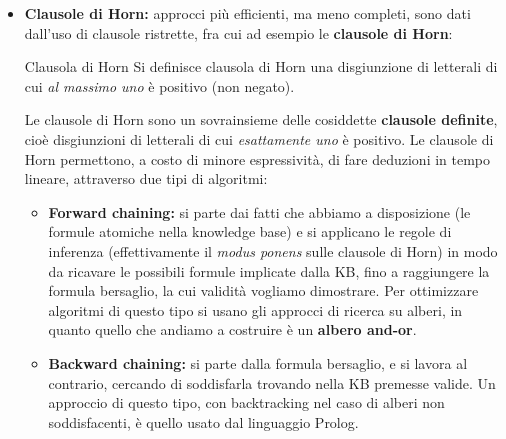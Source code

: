 \documentclass[a4paper,11pt]{article}
\begin{document}
\begin{itemize}
\begin{itemize}
\item \textbf{Clausole di Horn:}
approcci più efficienti, ma meno completi, sono dati dall'uso di clausole ristrette, fra cui ad esempio le \textbf{clausole di Horn}:
\begin{definition}{Clausola di Horn}
	Si definisce clausola di Horn una disgiunzione di letterali di cui \textit{al massimo uno} è positivo (non negato).
\end{definition}
Le clausole di Horn sono un sovrainsieme delle cosiddette \textbf{clausole definite}, cioè disgiunzioni di letterali di cui \textit{esattamente uno} è positivo.
Le clausole di Horn permettono, a costo di minore espressività, di fare deduzioni in tempo lineare, attraverso due tipi di algoritmi:
\begin{itemize}
	\item \textbf{Forward chaining:} si parte dai fatti che abbiamo a disposizione (le formule atomiche nella knowledge base) e si applicano le regole di inferenza (effettivamente il \textit{modus ponens} sulle clausole di Horn) in modo da ricavare le possibili formule implicate dalla KB, fino a raggiungere la formula bersaglio, la cui validità vogliamo dimostrare.
		Per ottimizzare algoritmi di questo tipo si usano gli approcci di ricerca su alberi, in quanto quello che andiamo a costruire è un \textbf{albero and-or}. 
	\item \textbf{Backward chaining:} si parte dalla formula bersaglio, e si lavora al contrario, cercando di soddisfarla trovando nella KB premesse valide.
		Un approccio di questo tipo, con backtracking nel caso di alberi non soddisfacenti, è quello usato dal linguaggio Prolog.
\end{itemize}
\end{itemize}
\end{itemize}
\end{document}
